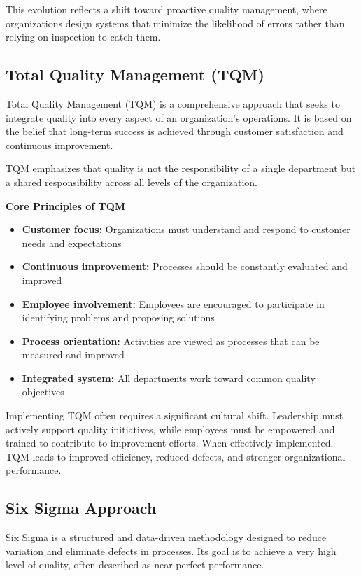 \documentclass[12pt,a4paper]{article}
\begin{document}
This evolution reflects a shift toward proactive quality management, where organizations design systems that minimize the likelihood of errors rather than relying on inspection to catch them.

\subsection*{Total Quality Management (TQM)}
Total Quality Management (TQM) is a comprehensive approach that seeks to integrate quality into every aspect of an organization’s operations. It is based on the belief that long-term success is achieved through customer satisfaction and continuous improvement.

TQM emphasizes that quality is not the responsibility of a single department but a shared responsibility across all levels of the organization.

\textbf{Core Principles of TQM}
\begin{itemize}
    \item \textbf{Customer focus:} Organizations must understand and respond to customer needs and expectations
    \item \textbf{Continuous improvement:} Processes should be constantly evaluated and improved
    \item \textbf{Employee involvement:} Employees are encouraged to participate in identifying problems and proposing solutions
    \item \textbf{Process orientation:} Activities are viewed as processes that can be measured and improved
    \item \textbf{Integrated system:} All departments work toward common quality objectives
\end{itemize}

Implementing TQM often requires a significant cultural shift. Leadership must actively support quality initiatives, while employees must be empowered and trained to contribute to improvement efforts. When effectively implemented, TQM leads to improved efficiency, reduced defects, and stronger organizational performance.

\subsection*{Six Sigma Approach}
Six Sigma is a structured and data-driven methodology designed to reduce variation and eliminate defects in processes. Its goal is to achieve a very high level of quality, often described as near-perfect performance.
\end{document}
